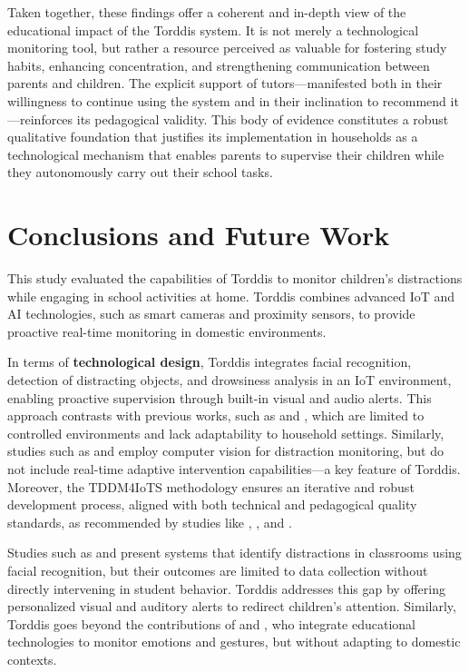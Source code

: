                 Taken together, these findings offer a coherent and in-depth view of the educational impact of the Torddis system. It is not merely a technological monitoring tool, but rather a resource perceived as valuable for fostering study habits, enhancing concentration, and strengthening communication between parents and children. The explicit support of tutors—manifested both in their willingness to continue using the system and in their inclination to recommend it—reinforces its pedagogical validity. This body of evidence constitutes a robust qualitative foundation that justifies its implementation in households as a technological mechanism that enables parents to supervise their children while they autonomously carry out their school tasks.
                
                \section{Conclusions and Future Work}
                \label{section:eight}
                This study evaluated the capabilities of Torddis to monitor children’s distractions while engaging in school activities at home. Torddis combines advanced IoT and AI technologies, such as smart cameras and proximity sensors, to provide proactive real-time monitoring in domestic environments.
                
                In terms of \textbf{technological design}, Torddis integrates facial recognition, detection of distracting objects, and drowsiness analysis in an IoT environment, enabling proactive supervision through built-in visual and audio alerts. This approach contrasts with previous works, such as \cite{Campbell2015Using} and \cite{Ucar2022Recognizing}, which are limited to controlled environments and lack adaptability to household settings. Similarly, studies such as \cite{Argel2023Intellitell} and \cite{Nguyen2019} employ computer vision for distraction monitoring, but do not include real-time adaptive intervention capabilities—a key feature of Torddis. Moreover, the TDDM4IoTS methodology ensures an iterative and robust development process, aligned with both technical and pedagogical quality standards, as recommended by studies like \cite{Erazo2016Easing}, \cite{Hachad2020}, and \cite{Salter2014Exploring}.
                
                Studies such as \cite{Erazo2016Easing} and \cite{Nguyen2019} present systems that identify distractions in classrooms using facial recognition, but their outcomes are limited to data collection without directly intervening in student behavior. Torddis addresses this gap by offering personalized visual and auditory alerts to redirect children's attention. Similarly, Torddis goes beyond the contributions of \cite{Ozdamli2022} and \cite{VilliersRader2021}, who integrate educational technologies to monitor emotions and gestures, but without adapting to domestic contexts.
                
